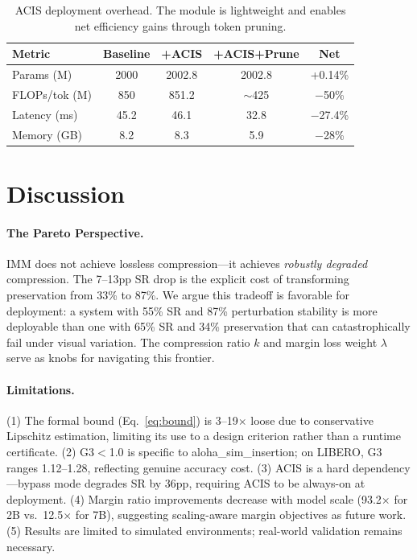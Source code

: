 \documentclass[10pt,twocolumn]{article}
\begin{document}
\begin{table}[t]
\centering
\caption{ACIS deployment overhead. The module is lightweight and enables net efficiency gains through token pruning.}
\label{tab:overhead}
\small
\begin{tabular}{@{}lcccc@{}}
\toprule
Metric & Baseline & +ACIS & +ACIS+Prune & Net \\
\midrule
Params (M) & 2000 & 2002.8 & 2002.8 & +0.14\% \\
FLOPs/tok (M) & 850 & 851.2 & $\sim$425 & $-$50\% \\
Latency (ms) & 45.2 & 46.1 & 32.8 & $-$27.4\% \\
Memory (GB) & 8.2 & 8.3 & 5.9 & $-$28\% \\
\bottomrule
\end{tabular}
\end{table}

\section{Discussion}
\label{sec:discussion}

\paragraph{The Pareto Perspective.}
IMM does not achieve lossless compression---it achieves \emph{robustly degraded} compression. The 7--13pp SR drop is the explicit cost of transforming preservation from 33\% to 87\%. We argue this tradeoff is favorable for deployment: a system with 55\% SR and 87\% perturbation stability is more deployable than one with 65\% SR and 34\% preservation that can catastrophically fail under visual variation. The compression ratio $k$ and margin loss weight $\lambda$ serve as knobs for navigating this frontier.

\paragraph{Limitations.}
(1) The formal bound (Eq.~\ref{eq:bound}) is 3--19$\times$ loose due to conservative Lipschitz estimation, limiting its use to a design criterion rather than a runtime certificate.
(2) G3$<$1.0 is specific to aloha\_sim\_insertion; on LIBERO, G3 ranges 1.12--1.28, reflecting genuine accuracy cost.
(3) ACIS is a hard dependency---bypass mode degrades SR by 36pp, requiring ACIS to be always-on at deployment.
(4) Margin ratio improvements decrease with model scale (93.2$\times$ for 2B vs.\ 12.5$\times$ for 7B), suggesting scaling-aware margin objectives as future work.
(5) Results are limited to simulated environments; real-world validation remains necessary.
\end{document}
